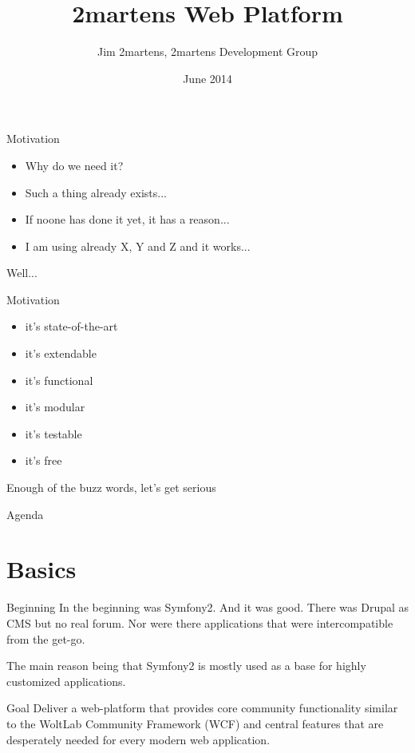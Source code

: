\documentclass{beamer}
\begin{document}
\author{Jim 2martens, 2martens Development Group}
\title{2martens Web Platform}
\date{June 2014}

	\begin{frame}
		\titlepage
	\end{frame}
	
	\begin{frame}{Motivation}
		\begin{itemize}
			\item Why do we need it?
			\item Such a thing already exists...
			\item If noone has done it yet, it has a reason...
			\item I am using already X, Y and Z and it works...
		\end{itemize}
		
		Well...
	\end{frame}
	
	\begin{frame}{Motivation}
		\begin{itemize}
			\item it's state-of-the-art
			\item it's extendable
			\item it's functional
			\item it's modular
			\item it's testable
			\item it's free
		\end{itemize}
		
		Enough of the buzz words, let's get serious
	\end{frame}	
	
	\begin{frame}{Agenda}
		\tableofcontents
	\end{frame}
	
	\section{Basics}
	\begin{frame}{Beginning}
		In the beginning was Symfony2. And it was good. There was Drupal as CMS but no real forum. Nor were there applications that were intercompatible from the get-go.
		
		The main reason being that Symfony2 is mostly used as a base for highly customized applications.
	\end{frame}
	
	\begin{frame}{Goal}
		Deliver a web-platform that provides core community functionality similar to the WoltLab Community Framework (WCF) and central features that are desperately needed for every modern web application.	
	\end{frame}
	
\end{document}
